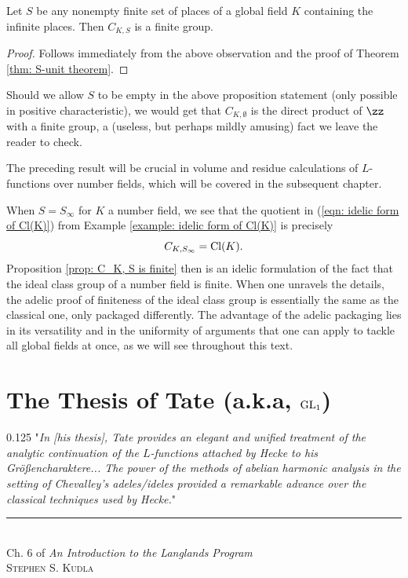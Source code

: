 \documentclass[11pt, x11names, openany]{book}
\newenvironment{myquote}[3]
{
    \begin{flushright}
    \begin{adjustwidth}{0.125\textwidth}{}
    "\textit{\small #1}"\\
    \end{adjustwidth}
    \rule{.75\linewidth}{0.5pt}\\
    #2\\ \textsc{#3}

}
{
    \end{flushright}
}
\begin{document}
\begin{prop}
\label{prop: C_K, S is finite}
Let $S$ be any nonempty finite set of places of a global field $K$ containing the infinite places. Then $C_{K, S}$ is a finite group.
\end{prop}
\begin{proof}
    Follows immediately from the above observation and the proof of Theorem \ref{thm: S-unit theorem}.
\end{proof}

\begin{remark}
Should we allow $S$ to be empty in the above proposition statement (only possible in positive characteristic), we would get that $C_{K, \emptyset}$ is the direct product of $\zz$ with a finite group, a (useless, but perhaps mildly amusing) fact we leave the reader to check.
\end{remark}

The preceding result will be crucial in volume and residue calculations of $L$-functions over number fields, which will be covered in the subsequent chapter.

\begin{example}
\label{example: ideal class group}
When $S = S_\infty$ for $K$ a number field, we see that the quotient in (\ref{eqn: idelic form of Cl(K)}) from Example \ref{example: idelic form of Cl(K)} is precisely
\begin{equation*}
    C_{K, S_\infty} = \operatorname{Cl}(K).
\end{equation*}
Proposition \ref{prop: C_K, S is finite} then is an idelic formulation of the fact that the ideal class group of a number field is finite. 
When one unravels the details, the adelic proof of finiteness of the ideal class group is essentially the same as the classical one, only packaged differently. The advantage of the adelic packaging lies in its versatility and in the uniformity of arguments that one can apply to tackle all global fields at once, as we will see throughout this text.
\end{example}






\chapter{The Thesis of Tate (a.k.a, $\operatorname{GL}_1$)}
\label{chapter: Tate's thesis}

\begin{myquote}{In [his thesis], Tate provides an elegant and unified treatment of the analytic continuation of the $L$-functions attached by Hecke to his Gr{\"o}{\ss}encharaktere... The power of the methods of abelian harmonic analysis in the setting of Chevalley's adeles/ideles provided a remarkable advance over the classical techniques used by Hecke.}{Ch. 6 of \textit{An Introduction to the Langlands Program}}{Stephen S. Kudla}

\end{myquote}
\end{document}
